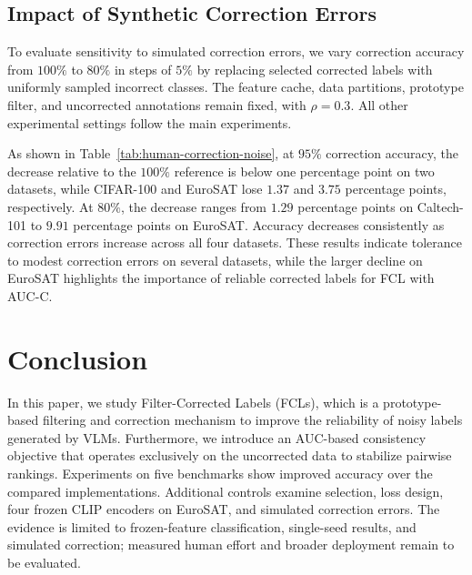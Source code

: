 \documentclass[10pt,twocolumn,letterpaper]{article}
\begin{document}
\subsection{Impact of Synthetic Correction Errors}
To evaluate sensitivity to simulated correction errors, we vary correction accuracy from $100\%$ to $80\%$ in steps of $5\%$ by replacing selected corrected labels with uniformly sampled incorrect classes. The feature cache, data partitions, prototype filter, and uncorrected annotations remain fixed, with $\rho=0.3$. All other experimental settings follow the main experiments.

As shown in Table~\ref{tab:human-correction-noise}, at $95\%$ correction accuracy, the decrease relative to the $100\%$ reference is below one percentage point on two datasets, while CIFAR-100 and EuroSAT lose $1.37$ and $3.75$ percentage points, respectively. At $80\%$, the decrease ranges from $1.29$ percentage points on Caltech-101 to $9.91$ percentage points on EuroSAT. Accuracy decreases consistently as correction errors increase across all four datasets. These results indicate tolerance to modest correction errors on several datasets, while the larger decline on EuroSAT highlights the importance of reliable corrected labels for FCL with AUC-C.

\section{Conclusion}
In this paper, we study Filter-Corrected Labels (FCLs), which is a prototype-based filtering and correction mechanism to improve the reliability of noisy labels generated by VLMs. Furthermore, we introduce an AUC-based consistency objective that operates exclusively on the uncorrected data to stabilize pairwise rankings.
Experiments on five benchmarks show improved accuracy over the compared implementations. Additional controls examine selection, loss design, four frozen CLIP encoders on EuroSAT, and simulated correction errors. The evidence is limited to frozen-feature classification, single-seed results, and simulated correction; measured human effort and broader deployment remain to be evaluated.
\end{document}
